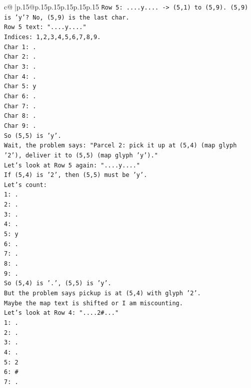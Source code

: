 \documentclass{article}
\begin{document}
{\begin{supertabular}{c@{$\;$}|p{.15\linewidth}@{}p{.15\linewidth}p{.15\linewidth}p{.15\linewidth}p{.15\linewidth}p{.15\linewidth}}
{{{\texttt{Row 5: ....y.... {-}> (5,1) to (5,9). (5,9) is 'y'? No, (5,9) is the last char.} \\
\texttt{Row 5 text: "....y...."} \\
\texttt{Indices: 1,2,3,4,5,6,7,8,9.} \\
\texttt{Char 1: .} \\
\texttt{Char 2: .} \\
\texttt{Char 3: .} \\
\texttt{Char 4: .} \\
\texttt{Char 5: y} \\
\texttt{Char 6: .} \\
\texttt{Char 7: .} \\
\texttt{Char 8: .} \\
\texttt{Char 9: .} \\
\texttt{So (5,5) is 'y'.} \\
\texttt{Wait, the problem says: "Parcel 2: pick it up at (5,4) (map glyph '2'), deliver it to (5,5) (map glyph 'y')."} \\
\texttt{Let's look at Row 5 again: "....y...."} \\
\texttt{If (5,4) is '2', then (5,5) must be 'y'.} \\
\texttt{Let's count:} \\
\texttt{1: .} \\
\texttt{2: .} \\
\texttt{3: .} \\
\texttt{4: .} \\
\texttt{5: y} \\
\texttt{6: .} \\
\texttt{7: .} \\
\texttt{8: .} \\
\texttt{9: .} \\
\texttt{So (5,4) is '.', (5,5) is 'y'.} \\
\texttt{But the problem says pickup is at (5,4) with glyph '2'.} \\
\texttt{Maybe the map text is shifted or I am miscounting.} \\
\texttt{Let's look at Row 4: "....2\#..."} \\
\texttt{1: .} \\
\texttt{2: .} \\
\texttt{3: .} \\
\texttt{4: .} \\
\texttt{5: 2} \\
\texttt{6: \#} \\
\texttt{7: .} \\
}}}
\end{supertabular}}
\end{document}
